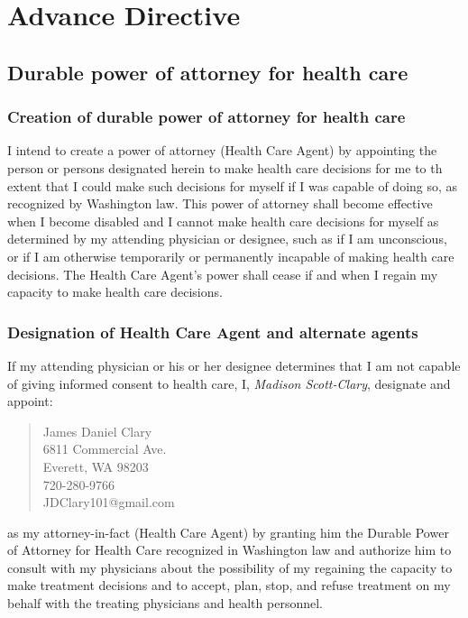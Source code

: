 \documentclass[oneside]{memoir}
\begin{document}
\section*{Advance Directive}\label{advance-directive}

\subsection{Durable power of attorney for health care}\label{durable-power-of-attorney-for-health-care}

\subsubsection{Creation of durable power of attorney for health care}\label{creation-of-durable-power-of-attorney-for-health-care}

I intend to create a power of attorney (Health Care Agent) by appointing the person or persons designated herein to make health care decisions for me to th extent that I could make such decisions for myself if I was capable of doing so, as recognized by Washington law. This power of attorney shall become effective when I become disabled and I cannot make health care decisions for myself as determined by my attending physician or designee, such as if I am unconscious, or if I am otherwise temporarily or permanently incapable of making health care decisions. The Health Care Agent's power shall cease if and when I regain my capacity to make health care decisions.

\subsubsection{Designation of Health Care Agent and alternate agents}\label{designation-of-health-care-agent-and-alternate-agents}

If my attending physician or his or her designee determines that I am not capable of giving informed consent to health care, I, \emph{Madison Scott-Clary}, designate and appoint:

\begin{quote}
    James Daniel Clary\\
    6811 Commercial Ave.\\
    Everett, WA 98203\\
    720-280-9766\\
    JDClary101@gmail.com
\end{quote}

as my attorney-in-fact (Health Care Agent) by granting him the Durable Power of Attorney for Health Care recognized in Washington law and authorize him to consult with my physicians about the possibility of my regaining the capacity to make treatment decisions and to accept, plan, stop, and refuse treatment on my behalf with the treating physicians and health personnel.
\end{document}
